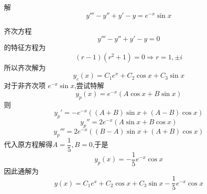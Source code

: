 \begin{questions}
    \question 解
    \[
    y'''-y''+y'-y=e^{-x}\sin x
    \]
    \begin{solution}
        齐次方程
        \[
        y'''-y''+y'-y=0
        \]
        的特征方程为
        \[
        (r-1)(r^2+1)=0 \Rightarrow r=1, \pm i
        \]
        所以齐次解为
        \[
        y_c(x) = C_1 e^x + C_2 \cos x + C_3 \sin x
        \]
        对于非齐次项 $e^{-x}\sin x$,尝试特解
        \[
        y_p(x) = e^{-x}(A\cos x + B \sin x)
        \]
        则
        \[
        y_p'= -e^{-x}((A+B) \sin x+(A-B)\cos x)
        \]
        \[
        y_p''= 2e^{-x}(A\sin x + B \cos x)
        \]
        \[
        y_p'''= 2e^{-x}((B-A) \sin x+(A+B)\cos x)
        \]
        代入原方程解得$A=\dfrac{1}{5},B=0$,于是
        \[
        y_p(x) = -\frac{1}{5} e^{-x} \cos x
        \]
        因此通解为
        \[
        y(x) = C_1 e^x + C_2 \cos x + C_3 \sin x - \frac{1}{5} e^{-x} \cos x
        \]
    \end{solution}


\end{questions}
